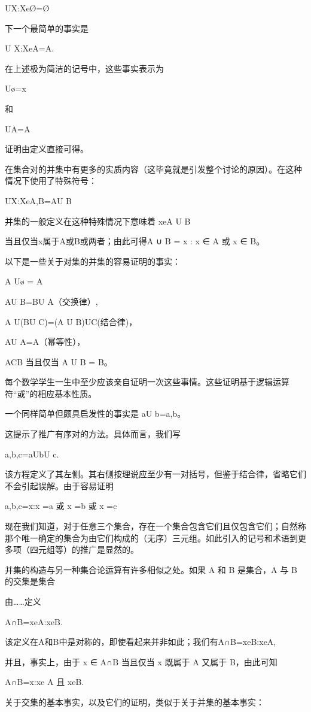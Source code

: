 \documentclass[12pt,a4paper]{ctexbook}
\theoremstyle{definition}
\theoremstyle{remark}
\begin{document}
U{X:XeØ}=Ø

下一个最简单的事实是

U {X:Xe{A}}=A.

在上述极为简洁的记号中，这些事实表示为

Uø=x

和

U{A}=A

证明由定义直接可得。

在集合对的并集中有更多的实质内容（这毕竟就是引发整个讨论的原因）。在这种情况下使用了特殊符号：

U{X:Xe{A,B}}=AU B

并集的一般定义在这种特殊情况下意味着 xeA U B

当且仅当x属于A或B或两者；由此可得A ∪ B = {x : x ∈ A 或 x ∈ B}。

以下是一些关于对集的并集的容易证明的事实：

A Uø = A

AU B=BU A（交换律）,

A U(BU C)=(A U B)UC(结合律)，

AU A=A（幂等性），

ACB 当且仅当 A U B = B。

每个数学学生一生中至少应该亲自证明一次这些事情。这些证明基于逻辑运算符“或”的相应基本性质。

一个同样简单但颇具启发性的事实是 {a}U {b}={a,b}。

这提示了推广有序对的方法。具体而言，我们写

{a,b,c}={a}U{b}U {c}.

该方程定义了其左侧。其右侧按理说应至少有一对括号，但鉴于结合律，省略它们不会引起误解。由于容易证明

{a,b,c}={x:x =a 或 x =b 或 x =c}

现在我们知道，对于任意三个集合，存在一个集合包含它们且仅包含它们；自然称那个唯一确定的集合为由它们构成的（无序）三元组。如此引入的记号和术语到更多项（四元组等）的推广是显然的。

并集的构造与另一种集合论运算有许多相似之处。如果 A 和 B 是集合，A 与 B 的交集是集合

由……定义

A∩B={xeA:xeB}.

该定义在A和B中是对称的，即使看起来并非如此；我们有A∩B={xeB:xeA},

并且，事实上，由于 x ∈ A∩B 当且仅当 x 既属于 A 又属于 B，由此可知

A∩B={x:xe A 且 xeB}.

关于交集的基本事实，以及它们的证明，类似于关于并集的基本事实：
\end{document}
